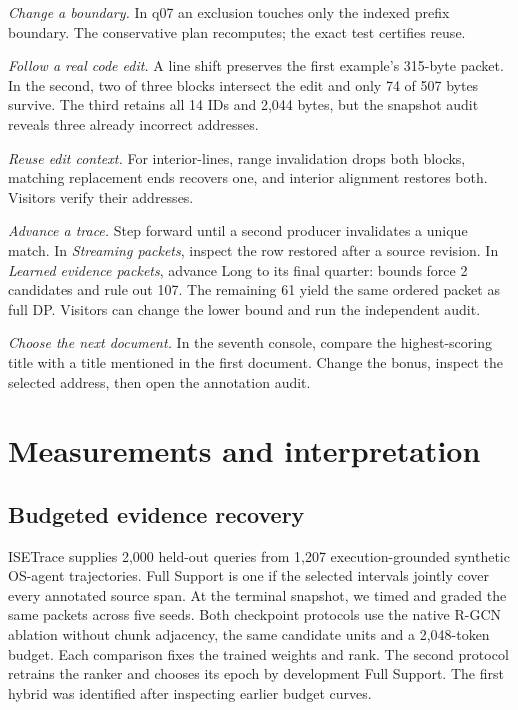 \documentclass[conference]{IEEEtran}
\begin{document}
\textit{Change a boundary.} In q07 an exclusion touches only the indexed prefix boundary. The conservative plan recomputes; the exact test certifies reuse.

\textit{Follow a real code edit.} A line shift preserves the first example's 315-byte packet. In the second, two of three blocks intersect the edit and only 74 of 507 bytes survive. The third retains all 14 IDs and 2,044 bytes, but the snapshot audit reveals three already incorrect addresses. 

\textit{Reuse edit context.} For interior-lines, range invalidation drops both blocks, matching replacement ends recovers one, and interior alignment restores both. Visitors verify their addresses.

\textit{Advance a trace.} Step forward until a second producer invalidates a unique match. In \emph{Streaming packets}, inspect the row restored after a source revision. In \emph{Learned evidence packets}, advance Long to its final quarter: bounds force 2 candidates and rule out 107. The remaining 61 yield the same ordered packet as full DP. Visitors can change the lower bound and run the independent audit.

\textit{Choose the next document.} In the seventh console, compare the highest-scoring title with a title mentioned in the first document. Change the bonus, inspect the selected address, then open the annotation audit.

\section{Measurements and interpretation}
\subsection{Budgeted evidence recovery}
ISETrace supplies 2,000 held-out queries from 1,207 execution-grounded synthetic OS-agent trajectories. Full Support is one if the selected intervals jointly cover every annotated source span. At the terminal snapshot, we timed and graded the same packets across five seeds. Both checkpoint protocols use the native R-GCN ablation without chunk adjacency, the same candidate units and a 2,048-token budget. Each comparison fixes the trained weights and rank. The second protocol retrains the ranker and chooses its epoch by development Full Support. The first hybrid was identified after inspecting earlier budget curves.
\end{document}
